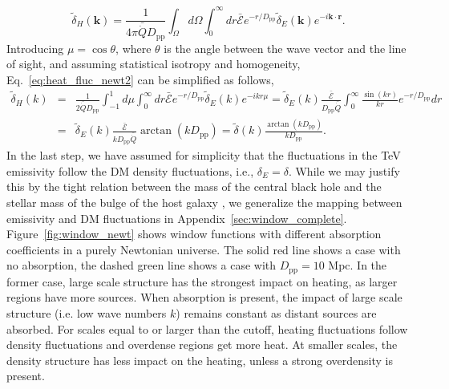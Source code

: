 \documentclass[numberedappendix]{emulateapj}
\begin{document}
{\begin{equation}
  \label{eq:heat_fluc_newt2}
  \tilde{\delta}_H(\mathbf{k})=\frac{1}{4\pi\bar{\dot{Q}}D_{\mathrm{pp}}} \int_{\Omega}d\Omega\int_0^{\infty}  dr \bar{ \mathcal{E}} e^{- r/D_{\mathrm{pp}}}  \tilde{\delta}_E(\mathbf{k}) e^{-i\mathbf{k}\cdot{\mathbf{r}}}.
\end{equation}
Introducing $\mu=\cos\theta$, where $\theta$ is the angle between the wave vector and the line of sight, and assuming statistical isotropy and homogeneity, Eq.~\eqref{eq:heat_fluc_newt2} can be simplified as follows,
\begin{eqnarray}
  \label{eq:heat_fluc_newt3}
  \tilde{\delta}_H(k)&=&  
  \frac{1}{2\bar{\dot{Q}}D_{\mathrm{pp}}} \int_{-1}^{1} d\mu \int_0^{\infty}dr  \bar{\mathcal{E}} e^{-r/D_{\mathrm{pp}}} \tilde{\delta}_E(k) e^{-ikr\mu}
  =\tilde{\delta}_E(k)\frac{\bar{\mathcal{E}}}{D_{\mathrm{pp}} \bar{\dot{Q}}}\int_0^{\infty} \frac{\sin(kr)}{kr} e^{-r/D_{\mathrm{pp}}}   dr\\ \nonumber
 &=&\tilde{\delta}_E(k)\frac{\bar{\mathcal{E}}}{k D_{\mathrm{pp}}\bar{\dot{Q}}} \arctan\left(k D_{\mathrm{pp}}\right)
  = \tilde{\delta}(k)\frac{\arctan\left(k D_{\mathrm{pp}}\right)}{k D_{\mathrm{pp}}} .
\end{eqnarray}
In the last step, we have assumed for simplicity that the fluctuations in the TeV emissivity follow the DM density fluctuations, i.e., $\delta_E=\delta$. While we may justify this by the tight relation between the mass of the central black hole and the stellar mass of the bulge of the host galaxy \citep{2004ApJ...604L..89H}, we generalize the mapping between emissivity and DM fluctuations in Appendix~\ref{sec:window_complete}. Figure~\ref{fig:window_newt} shows  window functions with different absorption coefficients in a purely Newtonian universe. The solid red line shows a case with no absorption, the dashed green line shows a case with $D_{\mathrm{pp}}=10$ Mpc.  In the former case, large scale structure has the strongest impact on heating, as larger regions have more sources. When absorption is present,  the impact of large scale structure (i.e. low wave numbers $k$) remains constant as distant sources are absorbed. For scales equal to or larger than the cutoff, heating fluctuations follow density fluctuations and overdense regions get more heat. At smaller scales, the density structure has less impact on the heating, unless a strong overdensity is present.  

}
\end{document}
